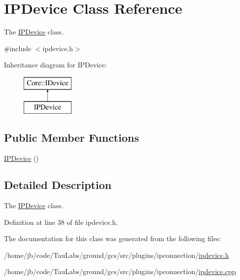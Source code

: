 \hypertarget{class_i_p_device}{\section{\-I\-P\-Device \-Class \-Reference}
\label{class_i_p_device}
}


\-The \hyperlink{class_i_p_device}{\-I\-P\-Device} class.  




{\ttfamily \#include $<$ipdevice.\-h$>$}

\-Inheritance diagram for \-I\-P\-Device\-:\begin{figure}[H]
\begin{center}
\leavevmode
\includegraphics[height=2.000000cm]{class_i_p_device}
\end{center}
\end{figure}
\subsection*{\-Public \-Member \-Functions}
\begin{DoxyCompactItemize}
\item 
\hyperlink{group___core_plugin_ga010455234abea0dd5af6ce5f06632331}{\-I\-P\-Device} ()
\end{DoxyCompactItemize}


\subsection{\-Detailed \-Description}
\-The \hyperlink{class_i_p_device}{\-I\-P\-Device} class. 

\-Definition at line 38 of file ipdevice.\-h.



\-The documentation for this class was generated from the following files\-:\begin{DoxyCompactItemize}
\item 
/home/jb/code/\-Tau\-Labs/ground/gcs/src/plugins/ipconnection/\hyperlink{ipdevice_8h}{ipdevice.\-h}\item 
/home/jb/code/\-Tau\-Labs/ground/gcs/src/plugins/ipconnection/\hyperlink{ipdevice_8cpp}{ipdevice.\-cpp}\end{DoxyCompactItemize}
